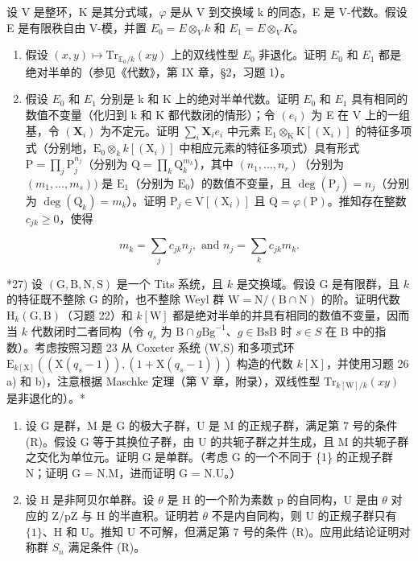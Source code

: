 设 V 是整环，K 是其分式域，\(\varphi\) 是从 V 到交换域 k 的同态，E 是 V-代数。假设 E 是有限秩自由 V-模，并置 \(E_{0} = E \otimes_{V} k\) 和 \(E_{1} = E \otimes_{V} K\)。

\begin{enumerate}
\def\labelenumi{\alph{enumi})}
\item
  假设 \((x,y)\mapsto\mathrm{Tr}_{\mathbb{E}_{0}/k}(xy)\) 上的双线性型 \(E_{0}\) 非退化。证明 \(E_{0}\) 和 \(E_{1}\) 都是绝对半单的（参见《代数》，第 IX 章，§2，习题 1）。
\item
  假设 \(E_{0}\) 和 \(E_{1}\) 分别是 k 和 K 上的绝对半单代数。证明 \(E_{0}\) 和 \(E_{1}\) 具有相同的数值不变量（化归到 k 和 K 都代数闭的情形）；令 \((e_{i})\) 为 E 在 V 上的一组基，令 \((\mathbf{X}_i)\) 为不定元。证明 \(\sum_{i}\mathbf{X}_{i}e_{i}\) 中元素 \(\mathrm{E}_1\otimes_{\mathrm{K}}\mathrm{K}[(\mathrm{X}_i)]\) 的特征多项式（分别地，\(\mathrm{E}_0\otimes_kk[(\mathrm{X}_i)]\) 中相应元素的特征多项式）具有形式 \(\mathrm{P} = \prod_j\mathrm{P}_j^{n_j}\)（分别为 \(\mathrm{Q} = \prod_k\mathrm{Q}_k^{m_k}\)），其中 \((n_1,\ldots ,n_r)\)（分别为 \((m_1,\dots ,m_s))\) 是 \(\mathrm{E}_1\)（分别为 \(\mathrm{E}_0\)）的数值不变量，且 \(\deg (\mathrm{P}_j) = n_j\)（分别为 \(\deg (\mathrm{Q}_k) = m_k\)）。证明 \(\mathrm{P}_j\in \mathrm{V}[(\mathrm{X}_i)]\) 且 \(\mathrm{Q} = \varphi (\mathrm{P})\)。推知存在整数 \(c_{jk}\geqslant 0\)，使得
\end{enumerate}

\[
m _ {k} = \sum_ {j} c _ {j k} n _ {j}, \text { and } n _ {j} = \sum_ {k} c _ {j k} m _ {k}.
\]

*27) 设 \((\mathrm{G},\mathrm{B},\mathrm{N},\mathrm{S})\) 是一个 Tits 系统，且 \(k\) 是交换域。假设 G 是有限群，且 \(k\) 的特征既不整除 G 的阶，也不整除 Weyl 群 \(\mathrm{W} = \mathrm{N} / (\mathrm{B}\cap \mathrm{N})\) 的阶。证明代数 \(\mathrm{H}_k(\mathrm{G},\mathrm{B})\)（习题 22）和 \(k[\mathrm{W}]\) 都是绝对半单的并具有相同的数值不变量，因而当 \(k\) 代数闭时二者同构（令 \(q_{s}\) 为 \(\mathrm{B}\cap g\mathrm{Bg}^{-1}\)、\(g\in \mathrm{BsB}\) 时 \(s\in S\) 在 B 中的指数）。考虑按照习题 23 从 Coxeter 系统 (W,S) 和多项式环 \(\mathrm{E}_{k[\mathrm{X}]}((\mathrm{X}(q_s - 1)),(1 + \mathrm{X}(q_s - 1)))\) 构造的代数 \(k[\mathrm{X}]\)，并使用习题 26 a) 和 b)，注意根据 Maschke 定理（第 V 章，附录），双线性型 \(\mathrm{Tr}_{k[\mathrm{W}] / k}(xy)\) 是非退化的）。*

\begin{enumerate}
\def\labelenumi{\arabic{enumi})}
\setcounter{enumi}{27}
\item
  设 G 是群，M 是 G 的极大子群，U 是 M 的正规子群，满足第 7 号的条件 (R)。假设 G 等于其换位子群，由 U 的共轭子群之并生成，且 M 的共轭子群之交化为单位元。证明 G 是单群。（考虑 G 的一个不同于 \{1\} 的正规子群 N；证明 G = N.M，进而证明 G = N.U。）
\item
  设 H 是非阿贝尔单群。设 \(\theta\) 是 H 的一个阶为素数 p 的自同构，U 是由 \(\theta\) 对应的 Z/pZ 与 H 的半直积。证明若 \(\theta\) 不是内自同构，则 U 的正规子群只有 \(\{1\}\)、H 和 U。推知 U 不可解，但满足第 7 号的条件 (R)。应用此结论证明对称群 \(S_{n}\) 满足条件 (R)。
\end{enumerate}

